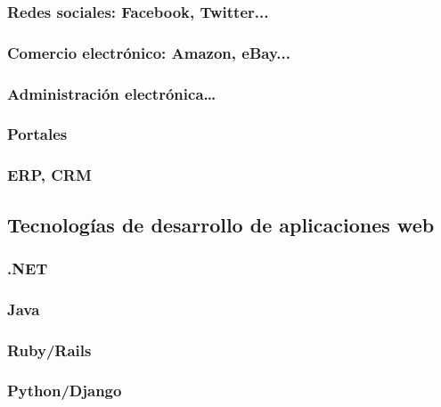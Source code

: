 \documentclass[a4paper,11pt,spanish]{sphinxmanual}
\begin{document}
\subsubsection{Redes sociales: Facebook, Twitter...}
\label{\detokenize{introduccion:id8}}

\subsubsection{Comercio electrónico: Amazon, eBay...}
\label{\detokenize{introduccion:id9}}

\subsubsection{Administración electrónica…}
\label{\detokenize{introduccion:id10}}

\subsubsection{Portales}
\label{\detokenize{introduccion:id11}}

\subsubsection{ERP, CRM}
\label{\detokenize{introduccion:id12}}

\subsection{Tecnologías de desarrollo de aplicaciones web}
\label{\detokenize{introduccion:id13}}

\subsubsection{.NET}
\label{\detokenize{introduccion:id14}}

\subsubsection{Java}
\label{\detokenize{introduccion:id15}}

\subsubsection{Ruby/Rails}
\label{\detokenize{introduccion:id16}}

\subsubsection{Python/Django}
\label{\detokenize{introduccion:id17}}
\end{document}
